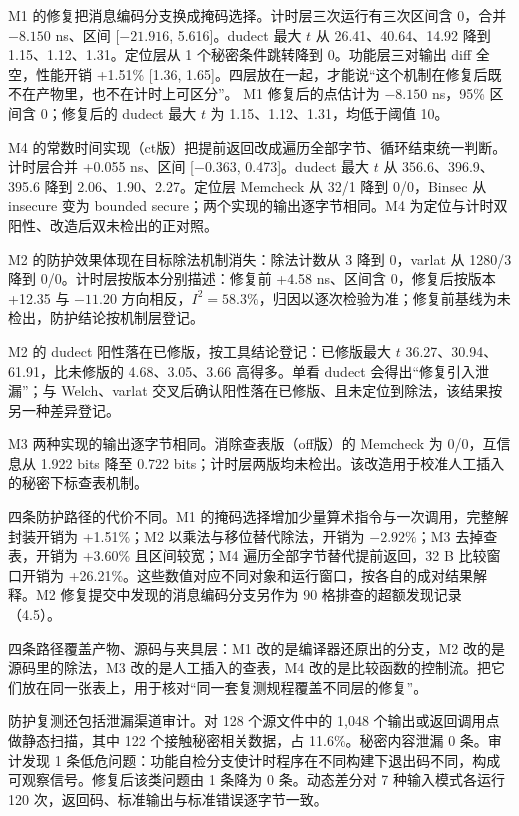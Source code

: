 M1 的修复把消息编码分支换成掩码选择。计时层三次运行有三次区间含 0，合并 $-8.150$ ns、区间 [$-21.916$, 5.616]。dudect 最大 $t$ 从 26.41、40.64、14.92 降到 1.15、1.12、1.31。定位层从 1 个秘密条件跳转降到 0。功能层三对输出 diff 全空，性能开销 +1.51\% [1.36, 1.65]。四层放在一起，才能说“这个机制在修复后既不在产物里，也不在计时上可区分”。
M1 修复后的点估计为 $-8.150$ ns，95\% 区间含 0；修复后的 dudect 最大 $t$ 为 1.15、1.12、1.31，均低于阈值 10。

M4 的常数时间实现（ct版）把提前返回改成遍历全部字节、循环结束统一判断。计时层合并 +0.055 ns、区间 [$-0.363$, 0.473]。dudect 最大 $t$ 从 356.6、396.9、395.6 降到 2.06、1.90、2.27。定位层 Memcheck 从 32/1 降到 0/0，Binsec 从 insecure 变为 bounded secure；两个实现的输出逐字节相同。M4 为定位与计时双阳性、改造后双未检出的正对照。

M2 的防护效果体现在目标除法机制消失：除法计数从 3 降到 0，varlat 从 1280/3 降到 0/0。计时层按版本分别描述：修复前 +4.58 ns、区间含 0，修复后按版本 +12.35 与 $-11.20$ 方向相反，$I^2=58.3\%$，归因以逐次检验为准；修复前基线为未检出，防护结论按机制层登记。

M2 的 dudect 阳性落在已修版，按工具结论登记：已修版最大 $t$ 36.27、30.94、61.91，比未修版的 4.68、3.05、3.66 高得多。单看 dudect 会得出“修复引入泄漏”；与 Welch、varlat 交叉后确认阳性落在已修版、且未定位到除法，该结果按另一种差异登记。

M3 两种实现的输出逐字节相同。消除查表版（off版）的 Memcheck 为 0/0，互信息从 1.922 bits 降至 0.722 bits；计时层两版均未检出。该改造用于校准人工插入的秘密下标查表机制。

四条防护路径的代价不同。M1 的掩码选择增加少量算术指令与一次调用，完整解封装开销为 +1.51\%；M2 以乘法与移位替代除法，开销为 $-2.92\%$；M3 去掉查表，开销为 +3.60\% 且区间较宽；M4 遍历全部字节替代提前返回，32 B 比较窗口开销为 +26.21\%。这些数值对应不同对象和运行窗口，按各自的成对结果解释。M2 修复提交中发现的消息编码分支另作为 90 格排查的超额发现记录（4.5）。

四条路径覆盖产物、源码与夹具层：M1 改的是编译器还原出的分支，M2 改的是源码里的除法，M3 改的是人工插入的查表，M4 改的是比较函数的控制流。把它们放在同一张表上，用于核对“同一套复测规程覆盖不同层的修复”。

防护复测还包括泄漏渠道审计。对 128 个源文件中的 1,048 个输出或返回调用点做静态扫描，其中 122 个接触秘密相关数据，占 11.6\%。秘密内容泄漏 0 条。审计发现 1 条低危问题：功能自检分支使计时程序在不同构建下退出码不同，构成可观察信号。修复后该类问题由 1 条降为 0 条。动态差分对 7 种输入模式各运行 120 次，返回码、标准输出与标准错误逐字节一致。%

